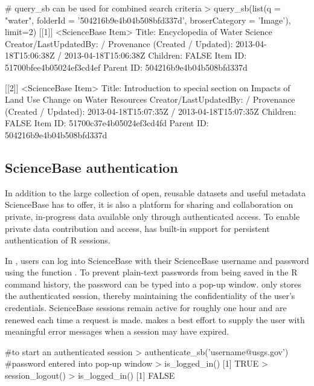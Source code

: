 \begin{example}

# query_sb can be used for combined search criteria
> query_sb(list(q = "water", folderId = '504216b9e4b04b508bfd337d', broserCategory = 'Image'), limit=2)
[[1]]
<ScienceBase Item>
  Title: Encyclopedia of Water Science
  Creator/LastUpdatedBy:      /
  Provenance (Created / Updated):  2013-04-18T15:06:38Z / 2013-04-18T15:06:38Z
  Children: FALSE
  Item ID: 51700bfee4b05024ef3cd4ef
  Parent ID: 504216b9e4b04b508bfd337d

[[2]]
<ScienceBase Item>
  Title: Introduction to special section on Impacts of Land Use Change on Water Resources
  Creator/LastUpdatedBy:      /
  Provenance (Created / Updated):  2013-04-18T15:07:35Z / 2013-04-18T15:07:35Z
  Children: FALSE
  Item ID: 51700c37e4b05024ef3cd4fd
  Parent ID: 504216b9e4b04b508bfd337d

\end{example}


\subsection{ScienceBase authentication}

In addition to the large collection of open, reusable datasets and
useful metadata ScienceBase has to offer, it is
also a platform for sharing and collaboration on private, in-progress
data available only through authenticated access. To enable
private data contribution and access,
 has built-in support for persistent
authentication of R sessions.

In , users can log into ScienceBase with their ScienceBase username
and password using the function . To prevent plain-text
passwords from being saved in the R command history, the password can be typed
into a pop-up window.  only stores the authenticated session,
thereby maintaining the confidentiality of the user's credentials. ScienceBase
sessions remain active for roughly one hour and are renewed each time a request
is made.  makes a best effort to supply the user with meaningful
error messages when a session may have expired.

\begin{example}
#to start an authenticated session
> authenticate_sb('username@usgs.gov') #password entered into pop-up window
> is_logged_in()
[1] TRUE
> session_logout()
> is_logged_in()
[1] FALSE
\end{example}

